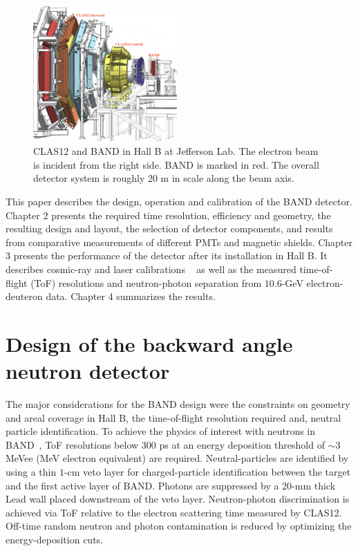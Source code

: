 \documentclass[3p,final,twocolumn]{elsarticle}
\begin{document}
\begin{figure}[t!]
	\centering
	\includegraphics[width=0.49\textwidth]{BandInClas.png}
        \caption{CLAS12 and BAND in Hall B at Jefferson Lab. The
          electron beam is incident from the right side. BAND is
          marked in red. The overall detector system is roughly 20
          \si{\meter} in scale along the beam axis. }
		\label{fig:clas12band}
\end{figure}
This paper describes the design, operation and calibration of the BAND detector.
Chapter 2 presents the required time resolution, efficiency and
geometry, the resulting design and layout, the selection of detector
components, and results from comparative measurements of different
PMTs and magnetic shields. Chapter 3 presents the performance of the
detector after its installation in Hall B. It describes cosmic-ray and
laser calibrations ~\cite{band-laser} as well as the measured
time-of-flight (ToF) resolutions and neutron-photon separation from
$10.6$-\si{\GeV} electron-deuteron data. Chapter 4 summarizes the
results.




\section{Design of the backward angle neutron detector}
The major considerations for the BAND design were the constraints on
geometry and areal coverage in Hall B, the time-of-flight resolution
required and, neutral particle identification.  To achieve the physics
of interest with neutrons in BAND~\cite{band-proposal}, ToF
resolutions below $300$ \si{\pico\second} at an energy deposition
threshold of $\sim 3$ MeVee (MeV electron equivalent) are required. Neutral-particles are
identified by using a thin $1$-\si{\centi\meter} veto layer for
charged-particle identification between the target and the first
active layer of BAND. Photons are suppressed by a 20-\si{\milli\meter}
thick Lead wall placed downstream of the veto layer. Neutron-photon
discrimination is achieved via ToF relative to the electron scattering
time measured by CLAS12. Off-time random neutron and photon
contamination is reduced by optimizing the energy-deposition cuts.
\end{document}
